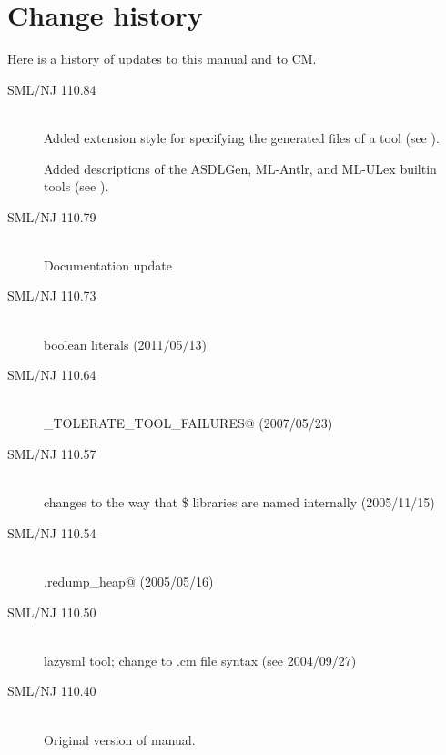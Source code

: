 %
\chapter{Change history}
\label{app:changes}

Here is a history of updates to this manual and to CM.
\begin{description}
  \item[SML/NJ 110.84]
    \mbox{}\\[0.5em]
    Added \lstinline@RENAME@ extension style for specifying the
    generated files of a tool (see ).

    Added descriptions of the ASDLGen, ML-Antlr, and ML-ULex builtin tools
    (see ).

  \item[SML/NJ 110.79]
    \mbox{}\\[0.5em]
    Documentation update

  \item[SML/NJ 110.73]
    \mbox{}\\[0.5em]
    boolean literals (2011/05/13)

  \item[SML/NJ 110.64]
    \mbox{}\\[0.5em]
     \lstinline@CM_TOLERATE_TOOL_FAILURES@ (2007/05/23)

  \item[SML/NJ 110.57]
    \mbox{}\\[0.5em]
    changes to the way that \$ libraries are named internally (2005/11/15)

  \item[SML/NJ 110.54]
    \mbox{}\\[0.5em]
    \lstinline@CM.redump_heap@ (2005/05/16)

  \item[SML/NJ 110.50]
    \mbox{}\\[0.5em]
    lazysml tool; change to .cm file syntax (see 2004/09/27)

  \item[SML/NJ 110.40]
    \mbox{}\\[0.5em]
    Original version of manual.
\end{description}%
